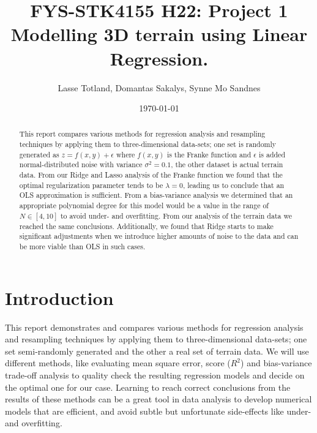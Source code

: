 \documentclass[reprint,english,notitlepage]{revtex4-1}  %
\begin{document}
\title{FYS-STK4155 H22: Project 1 \\ \vspace{}
\large{Modelling 3D terrain using Linear Regression.}}
\author{Lasse Totland, Domantas Sakalys, Synne Mo Sandnes}
\date{\today}      %
\noaffiliation                            %
\begin{abstract} %
This report compares various methods for regression analysis and resampling techniques by applying them to three-dimensional data-sets; one set is randomly generated as $z = f(x,y) + \epsilon$ where $f(x,y)$ is the Franke function and $\epsilon$ is added normal-distributed noise with variance $\sigma^2 = 0.1$, the other dataset is actual terrain data. From our Ridge and Lasso analysis of the Franke function we found that the optimal regularization parameter tends to be $\lambda = 0$, leading us to conclude that an OLS approximation is sufficient. From a bias-variance analysis we determined that an appropriate polynomial degree for this model would be a value in the range of $N \in [4, 10]$ to avoid under- and overfitting. From our analysis of the terrain data we reached the same conclusions. Additionally, we found that Ridge starts to make significant adjustments when we introduce higher amounts of noise to the data and can be more viable than OLS in such cases.
\end{abstract}                            %
\maketitle                                %



\section{Introduction} 

This report demonstrates and compares various methods for regression analysis and resampling techniques by applying them to three-dimensional data-sets; one set semi-randomly generated and the other a real set of terrain data. We will use different methods, like evaluating mean square error, score ($R^2$) and bias-variance trade-off analysis to quality check the resulting regression models and decide on the optimal one for our case. Learning to reach correct conclusions from the results of these methods can be a great tool in data analysis to develop numerical models that are efficient, and avoid subtle but unfortunate side-effects like under- and overfitting.
\end{document}
